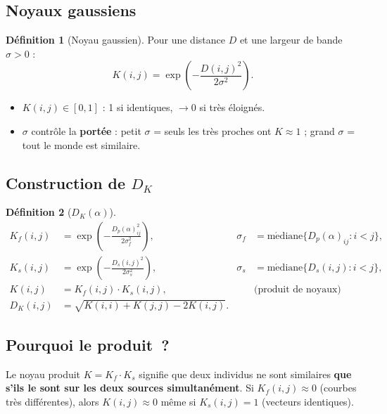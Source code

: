 \documentclass[11pt, a4paper]{article}
\newcommand{\Dp}{D_p}
\newcommand{\DK}{D_K}
\theoremstyle{definition}
\newtheorem{definition}{Définition}[section]
\theoremstyle{remark}
\begin{document}
\subsection{Noyaux gaussiens}

\begin{definition}[Noyau gaussien]
Pour une distance $D$ et une largeur de bande $\sigma > 0$ :
\[
  K(i,j) = \exp\!\left( -\frac{D(i,j)^2}{2\sigma^2} \right).
\]
\end{definition}

\begin{itemize}[nosep]
  \item $K(i,j) \in [0, 1]$ : 1 si identiques, $\to 0$ si très éloignés.
  \item $\sigma$ contrôle la \textbf{portée} : petit $\sigma$ = seuls les très
    proches ont $K \approx 1$ ; grand $\sigma$ = tout le monde est similaire.
\end{itemize}

\subsection{Construction de $\DK$}

\begin{definition}[$\DK(\alpha)$]
\begin{align}
  K_f(i,j) &= \exp\!\left( -\frac{\Dp(\alpha)_{ij}^2}{2\sigma_f^2} \right),
  & \sigma_f &= \mathrm{m\acute{e}diane}\{\Dp(\alpha)_{ij} : i < j\},
  \label{eq:Kf} \\
  K_s(i,j) &= \exp\!\left( -\frac{D_s(i,j)^2}{2\sigma_s^2} \right),
  & \sigma_s &= \mathrm{m\acute{e}diane}\{D_s(i,j) : i < j\},
  \label{eq:Ks} \\
  K(i,j) &= K_f(i,j) \cdot K_s(i,j), & & \text{(produit de noyaux)}
  \label{eq:Kprod} \\
  \DK(i,j) &= \sqrt{K(i,i) + K(j,j) - 2K(i,j)}. & &
  \label{eq:DK}
\end{align}
\end{definition}

\subsection{Pourquoi le produit~?}

Le noyau produit $K = K_f \cdot K_s$ signifie que deux individus ne sont
similaires \textbf{que s'ils le sont sur les deux sources simultanément}.
Si $K_f(i,j) \approx 0$ (courbes très différentes), alors
$K(i,j) \approx 0$ même si $K_s(i,j) = 1$ (vecteurs identiques).
\end{document}
